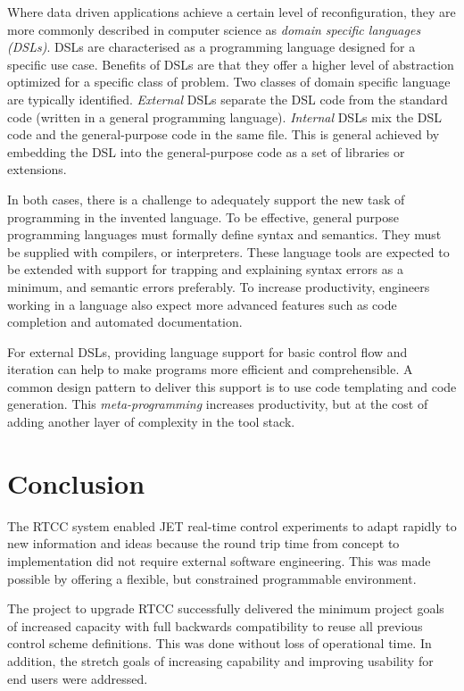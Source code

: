 \documentclass[preprint,12pt]{elsarticle}
\begin{document}
Where data driven applications achieve a certain level of reconfiguration, they are more commonly
described in computer science as {\em domain specific languages (DSLs)}. DSLs are characterised
as a programming language designed for a specific use case.  Benefits of DSLs are that they 
offer a higher level of abstraction optimized for a specific class of problem. Two classes
of domain specific language are typically identified. {\em External} DSLs separate the DSL
code from the standard code (written in a general programming language).  {\em Internal} DSLs
mix the DSL code and the general-purpose code in the same file.  This is general achieved by
embedding the DSL into the general-purpose code as a set of libraries or extensions.

In both cases, there is a challenge to adequately support the new task of programming
in the invented language.  To be effective, general purpose programming languages must
formally define syntax and semantics. They must be supplied with compilers, or interpreters.
These language tools are expected to be extended with support for trapping and explaining
syntax errors as a minimum, and semantic errors preferably.  To increase productivity, 
engineers working in a language also expect more advanced features such as code completion
and automated documentation.

For external DSLs, providing language support for basic control flow and iteration
can help to make programs more efficient and comprehensible.  A common design pattern
to deliver this support is to use code templating and code generation.  This
{\em meta-programming} increases productivity, but at the cost of adding another
layer of complexity in the tool stack.



\section{Conclusion}

The RTCC system enabled JET real-time control experiments to adapt rapidly to new information
and ideas because the round trip time from concept to implementation did not require 
external software engineering. This was made possible by offering a flexible, but 
constrained programmable environment.

The project to upgrade RTCC 
successfully delivered the minimum project goals of increased capacity with
full backwards compatibility to reuse all previous control scheme definitions.
This was done without loss of operational time.
In addition, the stretch goals of increasing capability and improving
usability for end users were addressed.  
\end{document}

